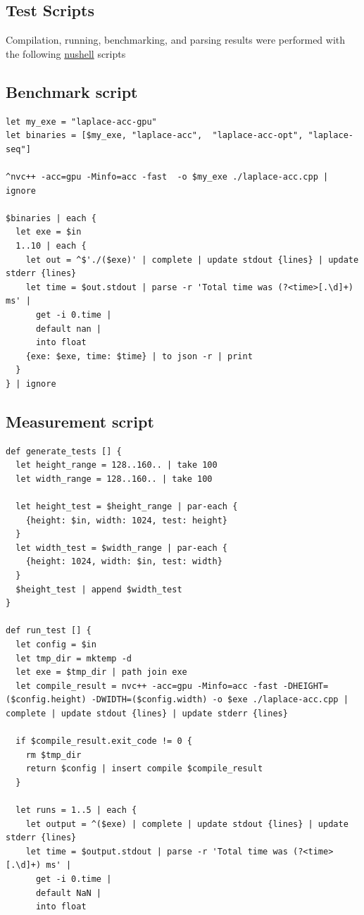 \documentclass{article}
\begin{document}
\begin{appendices}
  \clearpage
  \section{Test Scripts}
  Compilation, running, benchmarking, and parsing results were performed with the following
  \href{https://www.nushell.sh/}{nushell} scripts

  \subsection{Benchmark script}
  \begin{verbatim}
let my_exe = "laplace-acc-gpu"
let binaries = [$my_exe, "laplace-acc",  "laplace-acc-opt", "laplace-seq"]

^nvc++ -acc=gpu -Minfo=acc -fast  -o $my_exe ./laplace-acc.cpp | ignore

$binaries | each {
  let exe = $in
  1..10 | each {
    let out = ^$'./($exe)' | complete | update stdout {lines} | update stderr {lines}
    let time = $out.stdout | parse -r 'Total time was (?<time>[.\d]+) ms' | 
      get -i 0.time |
      default nan |
      into float
    {exe: $exe, time: $time} | to json -r | print
  }
} | ignore
  \end{verbatim}
  
  \subsection{Measurement script}
\begin{verbatim}
def generate_tests [] {
  let height_range = 128..160.. | take 100
  let width_range = 128..160.. | take 100
  
  let height_test = $height_range | par-each {
    {height: $in, width: 1024, test: height}
  }
  let width_test = $width_range | par-each {
    {height: 1024, width: $in, test: width}
  }
  $height_test | append $width_test
}

def run_test [] {
  let config = $in
  let tmp_dir = mktemp -d
  let exe = $tmp_dir | path join exe
  let compile_result = nvc++ -acc=gpu -Minfo=acc -fast -DHEIGHT=($config.height) -DWIDTH=($config.width) -o $exe ./laplace-acc.cpp | complete | update stdout {lines} | update stderr {lines}
  
  if $compile_result.exit_code != 0 {
    rm $tmp_dir
    return $config | insert compile $compile_result
  }

  let runs = 1..5 | each {
    let output = ^($exe) | complete | update stdout {lines} | update stderr {lines}
    let time = $output.stdout | parse -r 'Total time was (?<time>[.\d]+) ms' |
      get -i 0.time |
      default NaN |
      into float


\end{verbatim}
\end{appendices}
\end{document}
